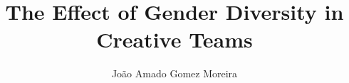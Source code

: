 \documentclass[12pt,reqno]{nuthesis}	%
\author{Jo\~{a}o Amado Gomez Moreira}
\title{The Effect of Gender Diversity in Creative Teams}
\begin{document}
%
%


\frontmatter		%

\maketitle		%

\copyrightpage		%


\abstract       %




\acknowledgements	%




\clearpage{} %
\tableofcontents	%

\clearpage{} %
\listoftables		%

\clearpage{} %
\listoffigures		%



\mainmatter             %











%
\begin{singlespace}
\bibsep 12pt


\end{singlespace}

\appendix




\end{document}
